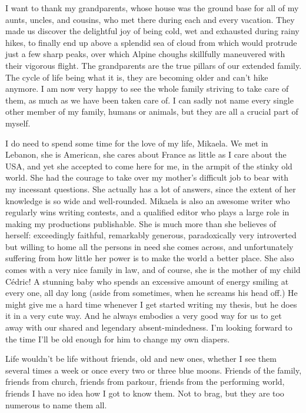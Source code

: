 I want to thank my grandparents, whose house was the ground base for all of my aunts, uncles, and cousins, who met there during each and every vacation. They made us discover the delightful joy of being cold, wet and exhausted during rainy hikes, to finally end up above a splendid sea of cloud from which would protrude just a few sharp peaks, over which Alpine choughs skillfully maneuvered with their vigorous flight. The grandparents are the true pillars of our extended family. The cycle of life being what it is, they are becoming older and can't hike anymore. I am now very happy to see the whole family striving to take care of them, as much as we have been taken care of. I can sadly not name every single other member of my family, humans or animals, but they are all a crucial part of myself. 

I do need to spend some time for the love of my life, Mikaela. We met in Lebanon, she is American, she cares about France as little as I care about the USA, and yet she accepted to come here for me, in the armpit of the stinky old world. She had the courage to take over my mother's difficult job to bear with my incessant questions. She actually has a lot of answers, since the extent of her knowledge is so wide and well-rounded. Mikaela is also an awesome writer who regularly wins writing contests, and a qualified editor who plays a large role in making my productions publishable. She is much more than she believes of herself: exceedingly faithful, remarkably generous, paradoxically very introverted but willing to home all the persons in need she comes across, and unfortunately suffering from how little her power is to make the world a better place. She also comes with a very nice family in law, and of course, she is the mother of my child Cédric! A stunning baby who spends an excessive amount of energy smiling at every one, all day long (aside from sometimes, when he screams his head off.) He might give me a hard time whenever I get started writing my thesis, but he does it in a very cute way. And he always embodies a very good way for us to get away with our shared and legendary absent-mindedness. I'm looking forward to the time I'll be old enough for him to change my own diapers.

Life wouldn't be life without friends, old and new ones, whether I see them several times a week or once every two or three blue moons. Friends of the family, friends from church, friends from parkour, friends from the performing world, friends I have no idea how I got to know them. Not to brag, but they are too numerous to name them all. 

